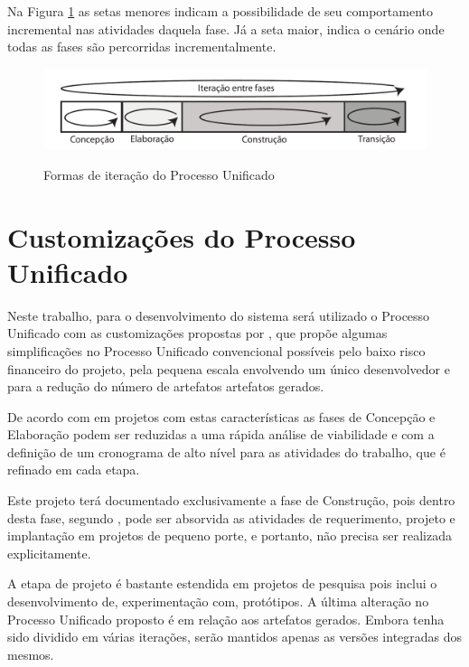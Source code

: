Na Figura \ref{fig:processo_unificado_iteracoes} as setas menores indicam a possibilidade de seu comportamento incremental nas atividades daquela fase. Já a seta maior, indica o cenário onde todas as fases são percorridas incrementalmente.

\begin{figure}[!h]
\centering
\caption{Formas de iteração do Processo Unificado}
\includegraphics[width=1.0\textwidth]{pdfs/img-processo-unificado-fases.pdf}
\label{fig:processo_unificado_iteracoes} 
\end{figure}

\section{Customizações do Processo Unificado}

Neste trabalho, para o desenvolvimento do sistema será utilizado o Processo Unificado com as customizações propostas por , que propõe algumas simplificações no Processo Unificado convencional possíveis pelo baixo risco financeiro do projeto, pela pequena escala envolvendo um único desenvolvedor e para a redução do número de artefatos artefatos gerados.

De acordo com  em projetos com estas características as fases de Concepção e Elaboração podem ser reduzidas a uma rápida análise de viabilidade e com a definição de um cronograma de alto nível para as atividades do trabalho, que é refinado em cada etapa.

Este projeto terá documentado exclusivamente a fase de Construção, pois dentro desta fase, segundo , pode ser absorvida as atividades de requerimento, projeto e implantação em projetos de pequeno porte, e portanto, não precisa ser realizada explicitamente.

A etapa de projeto é bastante estendida em projetos de pesquisa pois inclui o desenvolvimento de, experimentação com, protótipos. A última alteração no Processo Unificado proposto é em relação aos artefatos gerados. Embora tenha sido dividido em várias iterações, serão mantidos apenas as versões integradas dos mesmos.

